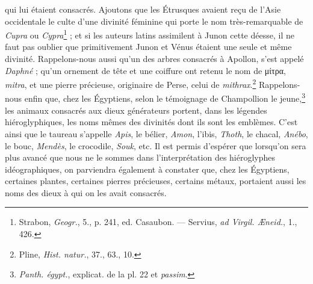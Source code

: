 \documentclass[a4paper, 11pt, oneside, polutonikogreek, french]{article}
\begin{document}
qui lui étaient consacrés. Ajoutons que les Étrusques avaient reçu de l'Asie occidentale le culte d'une divinité féminine qui porte le nom très-remarquable de \emph{Cupra} ou \emph{Cypra}\footnote{Strabon, \emph{Geogr.}, 5., p. 241, ed. Casaubon. --- Servius, \emph{ad Virgil. Æneid.}, 1., 426.} ; et si les auteurs latins assimilent à Junon cette déesse, il ne faut pas oublier que primitivement Junon et Vénus étaient une seule et même divinité. Rappelons-nous aussi qu'un des arbres consacrés à Apollon, s'est appelé \emph{Daphné} ; qu'un ornement de tête et une coiffure ont retenu le nom de μίτρα, \emph{mitra}, et une pierre précieuse, originaire de Perse, celui de \emph{mithrax}.\footnote{Pline, \emph{Hist. natur.}, 37., 63., 10.} Rappelons-nous enfin que, chez les Égyptiens, selon le témoignage de Champollion le jeune,\footnote{\emph{Panth. égypt.}, explicat. de la pl. 22 et \emph{passim}.} les animaux consacrés aux dieux générateurs portent, dans les légendes hiéroglyphiques, les noms mêmes des divinités dont ils sont les emblèmes. C'est ainsi que le taureau s'appelle \emph{Apis}, le bélier, \emph{Amon}, l'ibis, \emph{Thoth}, le chacal, \emph{Anébo}, le bouc, \emph{Mendès}, le crocodile, \emph{Souk}, etc. Il est permis d'espérer que lorsqu'on sera plus avancé que nous ne le sommes dans l'interprétation des hiéroglyphes idéographiques, on parviendra également à constater que, chez les Égyptiens, certaines plantes, certaines pierres précieuses, certains métaux, portaient aussi les noms des dieux à qui on les avait consacrés.
\end{document}
